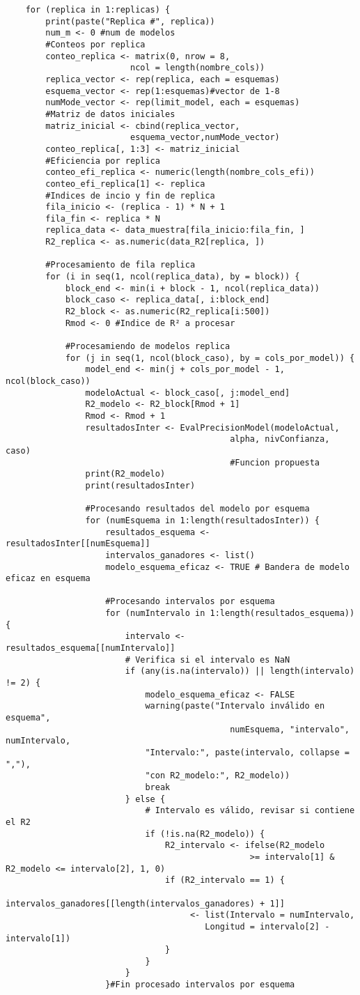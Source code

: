 \begin{verbatim}
	for (replica in 1:replicas) {
		print(paste("Replica #", replica))
		num_m <- 0 #num de modelos
		#Conteos por replica
		conteo_replica <- matrix(0, nrow = 8,
						 ncol = length(nombre_cols))
		replica_vector <- rep(replica, each = esquemas)
		esquema_vector <- rep(1:esquemas)#vector de 1-8
		numMode_vector <- rep(limit_model, each = esquemas)
		#Matriz de datos iniciales
		matriz_inicial <- cbind(replica_vector,
						 esquema_vector,numMode_vector)
		conteo_replica[, 1:3] <- matriz_inicial
		#Eficiencia por replica
		conteo_efi_replica <- numeric(length(nombre_cols_efi))
		conteo_efi_replica[1] <- replica
		#Indices de incio y fin de replica
		fila_inicio <- (replica - 1) * N + 1
		fila_fin <- replica * N
		replica_data <- data_muestra[fila_inicio:fila_fin, ]
		R2_replica <- as.numeric(data_R2[replica, ])
		
		#Procesamiento de fila replica
		for (i in seq(1, ncol(replica_data), by = block)) {
			block_end <- min(i + block - 1, ncol(replica_data))
			block_caso <- replica_data[, i:block_end]
			R2_block <- as.numeric(R2_replica[i:500])
			Rmod <- 0 #Indice de R² a procesar
			
			#Procesamiendo de modelos replica
			for (j in seq(1, ncol(block_caso), by = cols_por_model)) {
				model_end <- min(j + cols_por_model - 1, ncol(block_caso))
				modeloActual <- block_caso[, j:model_end]
				R2_modelo <- R2_block[Rmod + 1]
				Rmod <- Rmod + 1
				resultadosInter <- EvalPrecisionModel(modeloActual,
											 alpha, nivConfianza, caso)
											 #Funcion propuesta
				print(R2_modelo)
				print(resultadosInter)
				
				#Procesando resultados del modelo por esquema
				for (numEsquema in 1:length(resultadosInter)) {
					resultados_esquema <- resultadosInter[[numEsquema]]
					intervalos_ganadores <- list()
					modelo_esquema_eficaz <- TRUE # Bandera de modelo eficaz en esquema
					
					#Procesando intervalos por esquema
					for (numIntervalo in 1:length(resultados_esquema)) {
						intervalo <- resultados_esquema[[numIntervalo]]
						# Verifica si el intervalo es NaN
						if (any(is.na(intervalo)) || length(intervalo) != 2) {
							modelo_esquema_eficaz <- FALSE
							warning(paste("Intervalo inválido en esquema",
											 numEsquema, "intervalo", numIntervalo, 
							"Intervalo:", paste(intervalo, collapse = ","), 
							"con R2_modelo:", R2_modelo))
							break
						} else {
							# Intervalo es válido, revisar si contiene el R2
							if (!is.na(R2_modelo)) {
								R2_intervalo <- ifelse(R2_modelo
												 >= intervalo[1] & R2_modelo <= intervalo[2], 1, 0)
								if (R2_intervalo == 1) {
									intervalos_ganadores[[length(intervalos_ganadores) + 1]]
									 <- list(Intervalo = numIntervalo, 
									 	Longitud = intervalo[2] - intervalo[1])
								}
							}
						}
					}#Fin procesado intervalos por esquema
					

\end{verbatim}
